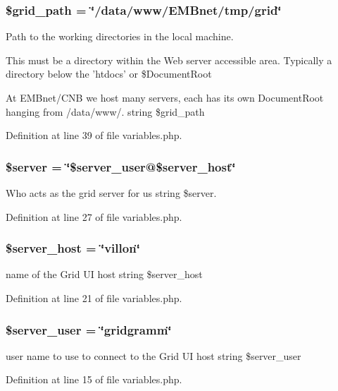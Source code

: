 \subsubsection{\setlength{\rightskip}{0pt plus 5cm}\$grid\_\-path = \char`\"{}/data/www/EMBnet/tmp/grid\char`\"{}}\label{variables_8php_a3}


Path to the working directories in the local machine. 

This must be a directory within the Web server accessible area. Typically a directory below the 'htdocs' or \$Document\-Root

At EMBnet/CNB we host many servers, each has its own Document\-Root hanging from /data/www/.  string \$grid\_\-path 

Definition at line 39 of file variables.php.
\subsubsection{\setlength{\rightskip}{0pt plus 5cm}\$server = \char`\"{}\$server\_\-user@\$server\_\-host\char`\"{}}\label{variables_8php_a2}


Who acts as the grid server for us  string \$server. 



Definition at line 27 of file variables.php.
\subsubsection{\setlength{\rightskip}{0pt plus 5cm}\$server\_\-host = \char`\"{}villon\char`\"{}}\label{variables_8php_a1}


name of the Grid UI host  string \$server\_\-host 



Definition at line 21 of file variables.php.
\subsubsection{\setlength{\rightskip}{0pt plus 5cm}\$server\_\-user = \char`\"{}gridgramm\char`\"{}}\label{variables_8php_a0}


user name to use to connect to the Grid UI host  string \$server\_\-user 



Definition at line 15 of file variables.php.